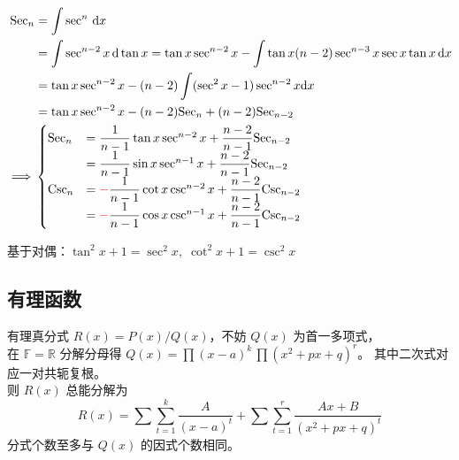 \documentclass[12pt, a4paper, UTF8, openany]{ctexbook}
\newcommand{\dif}{\mathrm{d}}
\newcommand{\difx}{\,\mathrm{d}x}
\newcommand{\field}[1]{\mathbb{#1}}%
\begin{document}
        $$\begin{aligned}
            \text{Sec}_n & = \int \sec^n \difx \\
                & = \int \sec^{n - 2}x \,\dif \tan x 
                = \tan x \sec^{n - 2}x - \int \tan x (n - 2) \sec^{n - 3} x \sec x \tan x \difx \\
                & = \tan x \sec^{n - 2} x - (n - 2) \int (\sec^2 x - 1) \sec^{n - 2} x \dif x \\
                & = \tan x \sec^{n - 2} x - (n - 2)\text{Sec}_n + (n - 2)\text{Sec}_{n - 2} \\
            \implies & 
            \begin{cases}
                \text{Sec}_n 
                    & = \dfrac{1}{n - 1} \tan x \sec^{n - 2} x + \dfrac{n - 2}{n - 1} \text{Sec}_{n - 2} \\
                    & = \dfrac{1}{n - 1} \sin x \sec^{n - 1} x + \dfrac{n - 2}{n - 1} \text{Sec}_{n - 2} \\
                \text{Csc}_n 
                    & = {\color{red}-}\dfrac{1}{n - 1} \cot x \csc^{n - 2} x + \dfrac{n - 2}{n - 1} \text{Csc}_{n - 2} \\
                    & = {\color{red}-}\dfrac{1}{n - 1} \cos x \csc^{n - 1} x + \dfrac{n - 2}{n - 1} \text{Csc}_{n - 2}
            \end{cases}
        \end{aligned}$$

        基于对偶：$\tan^2 x + 1 = \sec^2 x, \; \cot^2 x + 1 = \csc^2 x$

        \subsection{有理函数}
        有理真分式 $R(x) = P(x) / Q(x)$，不妨 $Q(x)$ 为首一多项式，\\
        在 $\field{F} = \field{R}$ 分解分母得 $Q(x) = \prod (x - a)^{k} \, \prod (x^2 + px + q)^{r}$。
        其中二次式对应一对共轭复根。\\
        则 $R(x)$ 总能分解为 $$R(x) = \sum\sum_{t = 1}^k \frac{A}{(x - a)^t} + \sum\sum_{t = 1}^r \frac{Ax + B}{(x^2 + px + q)^t}$$
        分式个数至多与 $Q(x)$ 的因式个数相同。
\end{document}
